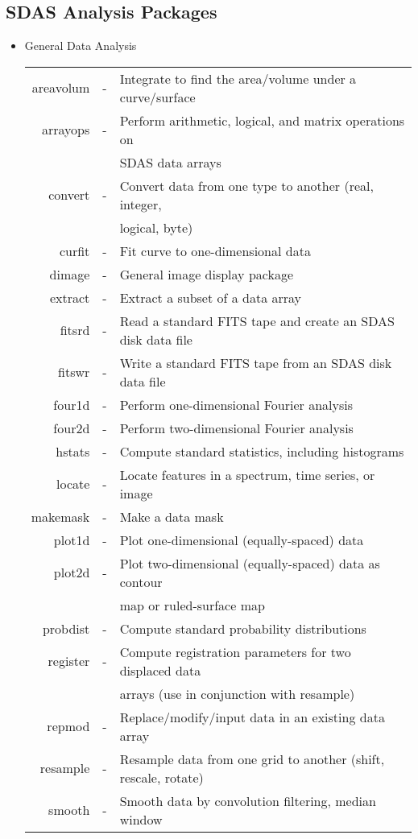 \subsection{SDAS Analysis Packages}

\begin{itemize}

\item General Data Analysis \\

\begin{tabular}{rcl}
   areavolum & - & Integrate to find the area/volume under a curve/surface\\
   arrayops & - & Perform arithmetic, logical, and matrix operations on\\
                  & &  \quad SDAS data arrays\\
   convert & - & Convert data from one type to another (real, integer,\\
                   & &  \quad logical, byte)\\
   curfit & - & Fit curve to one-dimensional data\\
   dimage & - & General image display package\\
   extract & - & Extract a subset of a data array\\
   fitsrd & - & Read a standard FITS tape and create an SDAS disk data file\\
   fitswr & - & Write a standard FITS tape from an SDAS disk data file\\
   four1d & - & Perform one-dimensional Fourier analysis\\
   four2d & - & Perform two-dimensional Fourier analysis\\
   hstats & - & Compute standard statistics, including histograms\\
   locate & - & Locate features in a spectrum, time series, or image\\
   makemask & - & Make a data mask\\
   plot1d & - & Plot one-dimensional (equally-spaced) data\\
   plot2d & - & Plot two-dimensional (equally-spaced) data as contour\\
                    & &  \quad map or ruled-surface map\\
   probdist & - & Compute standard probability distributions\\
   register & - & Compute registration parameters for two displaced data\\
                     & &  \quad arrays (use in conjunction with resample)\\
   repmod & - & Replace/modify/input data in an existing data array\\
   resample & - & Resample data from one grid to another (shift, rescale, rotate)\\
   smooth & - & Smooth data by convolution filtering, median window
\end{tabular}


\end{itemize}
